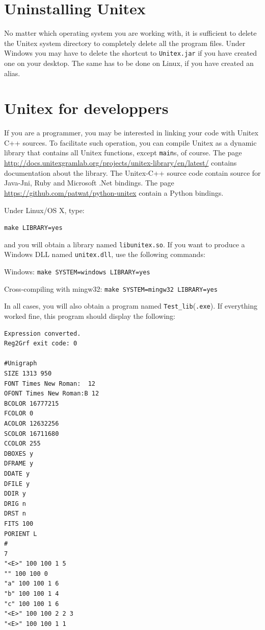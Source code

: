 \section{Uninstalling Unitex}
No matter which operating system you are working with, it is sufficient to delete 
the Unitex system directory to completely delete all the program files. Under
Windows you may have to delete the shortcut to \verb+Unitex.jar+  
if you have created one on your desktop. The same has to be done on Linux, if you have 
created an alias.


\section{Unitex for developpers}
\label{section-unitex-developpers}
If you are a programmer, you may be interested in linking your code with Unitex
C++ sources. To facilitate such operation, you can compile Unitex as a
dynamic library that contains all Unitex functions, except \verb+main+s, of
course. The page \url{http://docs.unitexgramlab.org/projects/unitex-library/en/latest/} contains documentation about the library.
The Unitex-C++ source code contain source for Java-Jni, Ruby and Microsoft .Net bindings. The
page \url{https://github.com/patwat/python-unitex} contain a Python bindings.

\bigskip Under Linux/OS X, type:

\bigskip
\verb+make LIBRARY=yes+

\bigskip
\noindent and you will obtain a library named \verb+libunitex.so+. If you want
to produce a Windows DLL named \verb+unitex.dll+, use the following commands:

\bigskip
Windows: \verb+make SYSTEM=windows LIBRARY=yes+

Cross-compiling with mingw32: \verb+make SYSTEM=mingw32 LIBRARY=yes+

\bigskip
\noindent In all cases, you will also obtain a program named
\verb+Test_lib+(\verb+.exe+). If everything worked fine, this program should 
display the following:

\begin{verbatim}
Expression converted.
Reg2Grf exit code: 0

#Unigraph
SIZE 1313 950
FONT Times New Roman:  12
OFONT Times New Roman:B 12
BCOLOR 16777215
FCOLOR 0
ACOLOR 12632256
SCOLOR 16711680
CCOLOR 255
DBOXES y
DFRAME y
DDATE y
DFILE y
DDIR y
DRIG n
DRST n
FITS 100
PORIENT L
#
7
"<E>" 100 100 1 5
"" 100 100 0
"a" 100 100 1 6
"b" 100 100 1 4
"c" 100 100 1 6
"<E>" 100 100 2 2 3
"<E>" 100 100 1 1
\end{verbatim}
